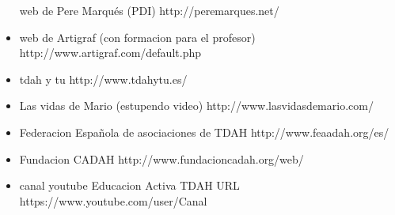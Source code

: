 \begin{itemize}
	web de Pere Marqués (PDI)
	http://peremarques.net/
	\item 
	web de Artigraf (con formacion para el profesor)
	http://www.artigraf.com/default.php
	\item 
	tdah y tu
	http://www.tdahytu.es/
	\item
	Las vidas de Mario (estupendo video)
	http://www.lasvidasdemario.com/
	\item 
	Federacion Española de asociaciones de TDAH
	http://www.feaadah.org/es/
	\item 
	Fundacion CADAH
	http://www.fundacioncadah.org/web/
	\item
	canal youtube Educacion Activa TDAH URL
	https://www.youtube.com/user/Canal

\end{itemize}
